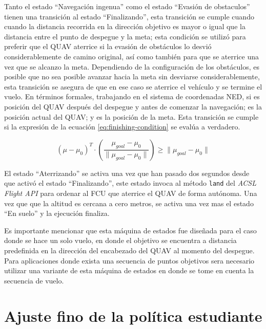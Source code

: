 Tanto el estado ``Navegación ingenua'' como el estado ``Evasión de obstaculos'' tienen una transición al estado ``Finalizando'', esta transición se cumple cuando cuando la distancia recorrida en la dirección objetivo es mayor o igual que la distancia entre el punto de despegue y la meta; esta condición se utilizó para preferir que el QUAV aterrice si la evasión de obstáculos lo desvió considerablemente de camino original, así como también para que se aterrice una vez que se alcanzo la meta. Dependiendo de la configuración de los obstáculos, es posible que no sea posible avanzar hacia la meta sin desviarse considerablemente, esta transición se asegura de que en ese caso se aterrice el vehículo y se termine el vuelo. En términos formales, trabajando en el sistema de coordenadas NED, si  es posición del QUAV después del despegue y antes de comenzar la navegación; \jim{\mu} es la posición actual del QUAV; y  es la posición de la meta. Esta transición se cumple si la expresión de la ecuación \ref{eq:finishing-condition} se evalúa a verdadero.

\begin{equation}
    \label{eq:finishing-condition}
    (\mu - \mu_0)^T \cdot \left (\frac{\mu_{goal} - \mu_0}{\|\mu_{goal} - \mu_0\|}  \right) \geq \|\mu_{goal} - \mu_0\|
\end{equation}

El estado ``Aterrizando'' se activa una vez que han pasado dos segundos desde que activó el estado ``Finalizando'', este estado invoca al método \texttt{land} del \textit{ACSL Flight API} para ordenar al FCU que aterrice el QUAV de forma autónoma. Una vez que que la altitud es cercana a cero metros, se activa una vez mas el estado ``En suelo'' y la ejecución finaliza.

Es importante mencionar que esta máquina de estados fue diseñada para el caso donde se hace un solo vuelo, en donde el objetivo se encuentra a distancia predefinida en la dirección del encabezado del QUAV al momento del despegue. Para aplicaciones donde exista una secuencia de puntos objetivos sera necesario utilizar una variante de esta máquina de estados en donde se tome en cuenta la secuencia de vuelo. 

\section{Ajuste fino de la política estudiante}

\label{sec:imp-finetune}

